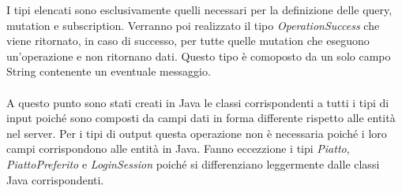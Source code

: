 I tipi elencati sono esclusivamente quelli necessari per la definizione delle query, mutation e subscription. Verranno poi realizzato il tipo \textit{OperationSuccess} che viene ritornato, in caso di successo, per tutte quelle mutation che eseguono un'operazione e non ritornano dati. Questo tipo è comoposto da un solo campo String contenente un eventuale messaggio.\\ \\
A questo punto sono stati creati in Java le classi corrispondenti a tutti i tipi di input poiché sono composti da campi dati in forma differente rispetto alle entità nel server. Per i tipi di output questa operazione non è necessaria poiché i loro campi corrispondono alle entità in Java. Fanno eccezzione i tipi \textit{Piatto}, \textit{PiattoPreferito} e \textit{LoginSession} poiché si differenziano leggermente dalle classi Java corrispondenti.
